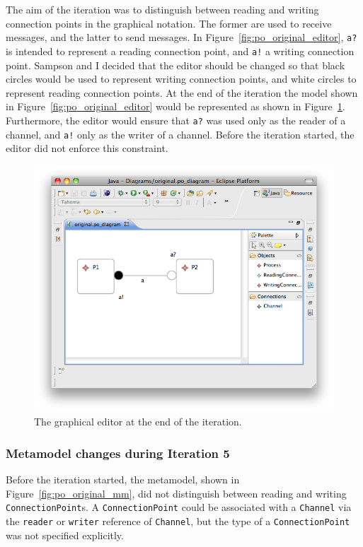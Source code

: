 The aim of the iteration was to distinguish between reading and writing connection points in the graphical notation. The former are used to receive messages, and the latter to send messages. In Figure~\ref{fig:po_original_editor}, \texttt{a?} is intended to represent a reading connection point, and \texttt{a!} a writing connection point. Sampson and I decided that the editor should be changed so that black circles would be used to represent writing connection points, and white circles to represent reading connection points. At the end of the iteration the model shown in Figure~\ref{fig:po_original_editor} would be represented as shown in Figure~\ref{fig:po_evolved_editor}. Furthermore, the editor would ensure that \texttt{a?} was used only as the reader of a channel, and \texttt{a!} only as the writer of a channel. Before the iteration started, the editor did not enforce this constraint.

\begin{figure}[htbp]
	\centering
	\includegraphics[width=13.5cm]{6.Evaluation/images/user_driven/po_evolved_editor.png}
	\caption{The graphical editor at the end of the iteration.}
	\label{fig:po_evolved_editor}
\end{figure}


\subsubsection{Metamodel changes during Iteration 5}
Before the iteration started, the metamodel, shown in Figure~\ref{fig:po_original_mm}, did not distinguish between reading and writing \texttt{Co\-nn\-ec\-ti\-o\-nPo\-i\-nt}s. A \texttt{Co\-nn\-ec\-ti\-o\-nPo\-i\-nt} could be associated with a \texttt{Ch\-an\-nel} via the \texttt{re\-ad\-er} or \texttt{wr\-it\-er} reference of \texttt{Ch\-an\-nel}, but the type of a \texttt{Co\-nn\-ec\-ti\-o\-nPo\-i\-nt} was not specified explicitly.

